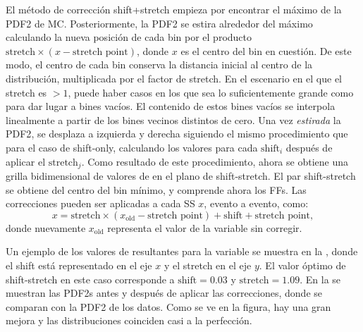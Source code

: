 El método de corrección shift+stretch empieza por encontrar el máximo de la \ac{PDF2} de \ac{MC}. Posteriormente, la \ac{PDF2} se estira alrededor del m\'aximo calculando la nueva posición de cada bin por el producto \(\text{stretch}\times (x - \text{stretch point})\), donde \(x\) es el centro del bin en cuesti\'on. De este modo, el centro de cada bin conserva la distancia inicial al centro de la distribución, multiplicada por el factor de stretch. En el escenario en el que el stretch es \(>1\), puede haber casos en los que sea lo suficientemente grande como para dar lugar a bines vacíos. El contenido de estos bines vacíos se interpola linealmente a partir de los bines vecinos distintos de cero.
Una vez \textit{estirada} la \ac{PDF2}, se desplaza a izquierda y derecha siguiendo el mismo procedimiento que para el caso de shift-only, calculando los valores \chisq para cada \(\text{shift}_i\) después de aplicar el \(\text{stretch}_j\). Como resultado de este procedimiento, ahora se obtiene una grilla bidimensional de valores de \chisq en el plano de shift-stretch. El par shift-stretch se obtiene del centro del bin mínimo, y comprende ahora los \acp{FF}. Las correcciones pueden ser aplicadas a cada \ac{SS} \(x\), evento a evento, como:
\begin{equation}
	x = \text{stretch}\times(x_{\text{old}} - \text{stretch point}) + \text{shift} + \text{stretch point},
\end{equation}
donde nuevamente \(x_\text{old}\) representa el valor de la variable sin corregir.

Un ejemplo de los valores de \chisq resultantes para la variable \fside se muestra en la \Fig{\ref{fig:ss_corrections:ffs:calculation:fside_calculation:chi2}}, donde el shift est\'a representado en el eje \(x\) y el stretch en el eje \(y\). El valor óptimo de shift-stretch en este caso corresponde a \(\text{shift}=0.03\) y \(\text{stretch}=1.09\). En la \Fig{\ref{fig:ss_corrections:ffs:calculation:fside_calculation:pdfs}} se muestran las \acp{PDF2} antes y después de aplicar las correcciones, donde se comparan con la \ac{PDF2} de los datos. Como se ve en la figura, hay una gran mejora y las distribuciones coinciden casi a la perfección.

